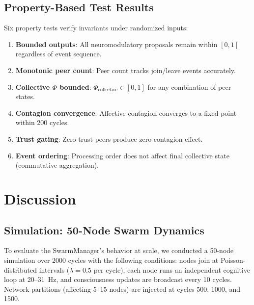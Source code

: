 \documentclass[11pt,a4paper]{article}
\begin{document}
\subsection{Property-Based Test Results}

Six property tests verify invariants under randomized inputs:

\begin{enumerate}
  \item \textbf{Bounded outputs}: All neuromodulatory proposals remain within $[0, 1]$ regardless of event sequence.
  \item \textbf{Monotonic peer count}: Peer count tracks join/leave events accurately.
  \item \textbf{Collective $\Phi$ bounded}: $\Phi_{\text{collective}} \in [0, 1]$ for any combination of peer states.
  \item \textbf{Contagion convergence}: Affective contagion converges to a fixed point within 200 cycles.
  \item \textbf{Trust gating}: Zero-trust peers produce zero contagion effect.
  \item \textbf{Event ordering}: Processing order does not affect final collective state (commutative aggregation).
\end{enumerate}

\section{Discussion}

\subsection{Simulation: 50-Node Swarm Dynamics}

To evaluate the SwarmManager's behavior at scale, we conducted a 50-node simulation over 2000 cycles with the following conditions: nodes join at Poisson-distributed intervals ($\lambda = 0.5$ per cycle), each node runs an independent cognitive loop at 20--31~Hz, and consciousness updates are broadcast every 10 cycles. Network partitions (affecting 5--15 nodes) are injected at cycles 500, 1000, and 1500.
\end{document}

